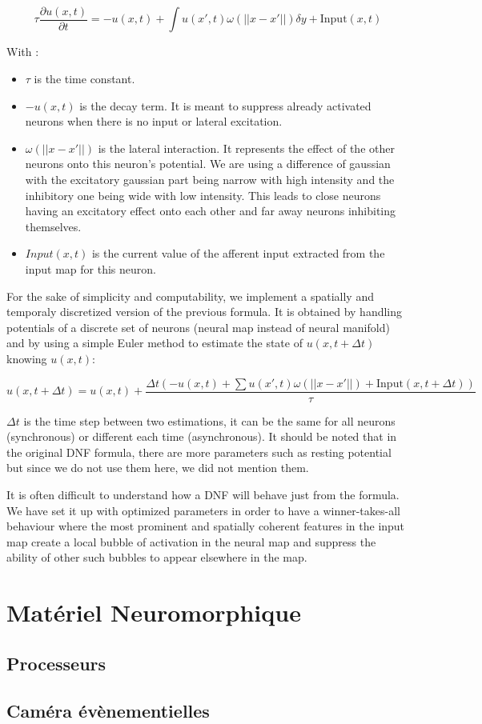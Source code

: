 $$\tau \frac{\partial u(x, t)}{\partial t} = -u(x,t)+\int u(x',t)\omega(||x-x'||)\delta y + \text{Input}(x,t)$$

With :
\begin{itemize}
    \item $\tau$ is the time constant.
    \item $-u(x,t)$ is the decay term. It is meant to suppress already activated neurons when there is no input or lateral excitation.
    \item $\omega(||x-x'||)$ is the lateral interaction. It represents the effect of the other neurons onto this neuron's potential. We are using a difference of gaussian with the excitatory gaussian part being narrow with high intensity and the inhibitory one being wide with low intensity. This leads to close neurons having an excitatory effect onto each other and far away neurons inhibiting themselves.
    \item $Input(x,t)$ is the current value of the afferent input extracted from the input map for this neuron.
\end{itemize}

For the sake of simplicity and computability, we implement a spatially and temporaly discretized version of the previous formula. It is obtained by handling potentials of a discrete set of neurons (neural map instead of neural manifold) and by using a simple Euler method to estimate the state of $u(x,t+\Delta t)$ knowing $u(x,t)$:

$$u(x, t+\Delta t) = u(x, t) +\frac{\Delta t\left(-u(x, t)+\sum u(x', t)\omega(||x-x'||) + \text{Input}(x, t+\Delta t)\right)}{\tau}$$

$\Delta t$ is the time step between two estimations, it can be the same for all neurons (synchronous) or different each time (asynchronous). It should be noted that in the original DNF formula, there are more parameters such as resting potential but since we do not use them here, we did not mention them.

It is often difficult to understand how a DNF will behave just from the formula. We have set it up with optimized parameters in order to have a winner-takes-all behaviour where the most prominent and spatially coherent features in the input map create a local bubble of activation in the neural map and suppress the ability of other such bubbles to appear elsewhere in the map. 

\newpage
\section{Matériel Neuromorphique}
\subsection{Processeurs}
\subsection{Caméra évènementielles}


